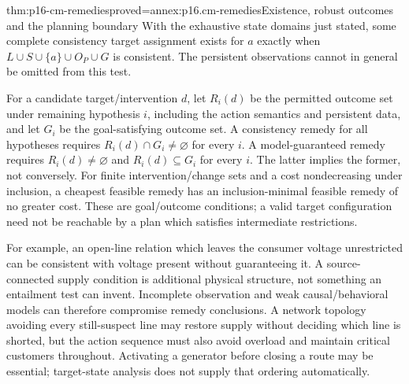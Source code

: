 \begin{hbtheorem}{thm:p16-cm-remedies}{proved=annex:p16.cm-remedies}{Existence, robust outcomes and the planning boundary}
With the exhaustive state domains just stated, some complete consistency
target assignment exists for \(a\) exactly when
\(L\cup S\cup\{a\}\cup O_P\cup G\) is consistent.
The persistent observations cannot in general be omitted from this test.

For a candidate target/intervention \(d\), let \(R_i(d)\) be the
permitted outcome set under remaining hypothesis \(i\), including the
action semantics and persistent data, and let \(G_i\) be the goal-satisfying
outcome set. A consistency remedy for all hypotheses
requires \(R_i(d)\cap G_i\ne\varnothing\) for every \(i\).
A model-guaranteed remedy requires \(R_i(d)\ne\varnothing\) and
\(R_i(d)\subseteq G_i\) for every \(i\). The latter implies the
former, not conversely. For finite intervention/change sets and a cost
nondecreasing under inclusion, a cheapest feasible remedy has an
inclusion-minimal feasible remedy of no greater cost. These are goal/outcome
conditions; a valid target configuration need not be reachable by a plan
which satisfies intermediate restrictions.
\end{hbtheorem}

For example, an open-line relation which leaves the consumer voltage
unrestricted can be consistent with voltage present without guaranteeing
it. A source-connected supply condition is additional physical structure,
not something an entailment test can invent. Incomplete observation and
weak causal/behavioral models can therefore compromise remedy conclusions.
A network topology avoiding every still-suspect line may restore supply
without deciding which line is shorted, but the action sequence must also
avoid overload and maintain critical customers throughout. Activating a
generator before closing a route may be essential; target-state analysis
does not supply that ordering automatically.

